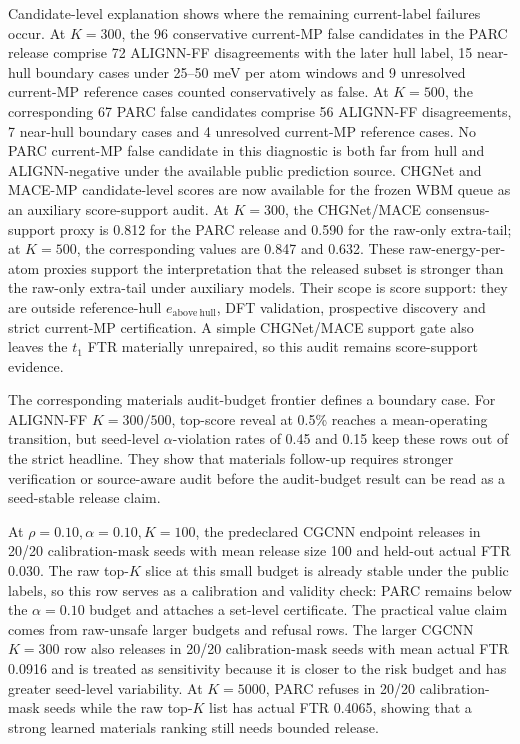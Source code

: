 \documentclass[10pt,twocolumn]{article}
\begin{document}
Candidate-level explanation shows where the remaining current-label failures occur.
At \(K=300\), the 96 conservative current-MP false candidates in the PARC release comprise 72 ALIGNN-FF disagreements with the later hull label, 15 near-hull boundary cases under 25--50 meV per atom windows and 9 unresolved current-MP reference cases counted conservatively as false.
At \(K=500\), the corresponding 67 PARC false candidates comprise 56 ALIGNN-FF disagreements, 7 near-hull boundary cases and 4 unresolved current-MP reference cases.
No PARC current-MP false candidate in this diagnostic is both far from hull and ALIGNN-negative under the available public prediction source.
CHGNet and MACE-MP candidate-level scores are now available for the frozen WBM queue as an auxiliary score-support audit.
At \(K=300\), the CHGNet/MACE consensus-support proxy is 0.812 for the PARC release and 0.590 for the raw-only extra-tail; at \(K=500\), the corresponding values are 0.847 and 0.632.
These raw-energy-per-atom proxies support the interpretation that the released subset is stronger than the raw-only extra-tail under auxiliary models.
Their scope is score support: they are outside reference-hull \(e_{\mathrm{above\ hull}}\), DFT validation, prospective discovery and strict current-MP certification.
A simple CHGNet/MACE support gate also leaves the \(t_1\) FTR materially unrepaired, so this audit remains score-support evidence.

The corresponding materials audit-budget frontier defines a boundary case.
For ALIGNN-FF \(K=300/500\), top-score reveal at 0.5\% reaches a mean-operating transition, but seed-level \(\alpha\)-violation rates of 0.45 and 0.15 keep these rows out of the strict headline.
They show that materials follow-up requires stronger verification or source-aware audit before the audit-budget result can be read as a seed-stable release claim.

At \(\rho=0.10,\alpha=0.10,K=100\), the predeclared CGCNN endpoint releases in 20/20 calibration-mask seeds with mean release size 100 and held-out actual FTR 0.030.
The raw top-\(K\) slice at this small budget is already stable under the public labels, so this row serves as a calibration and validity check: PARC remains below the \(\alpha=0.10\) budget and attaches a set-level certificate.
The practical value claim comes from raw-unsafe larger budgets and refusal rows.
The larger CGCNN \(K=300\) row also releases in 20/20 calibration-mask seeds with mean actual FTR 0.0916 and is treated as sensitivity because it is closer to the risk budget and has greater seed-level variability.
At \(K=5000\), PARC refuses in 20/20 calibration-mask seeds while the raw top-\(K\) list has actual FTR 0.4065, showing that a strong learned materials ranking still needs bounded release.
\end{document}
